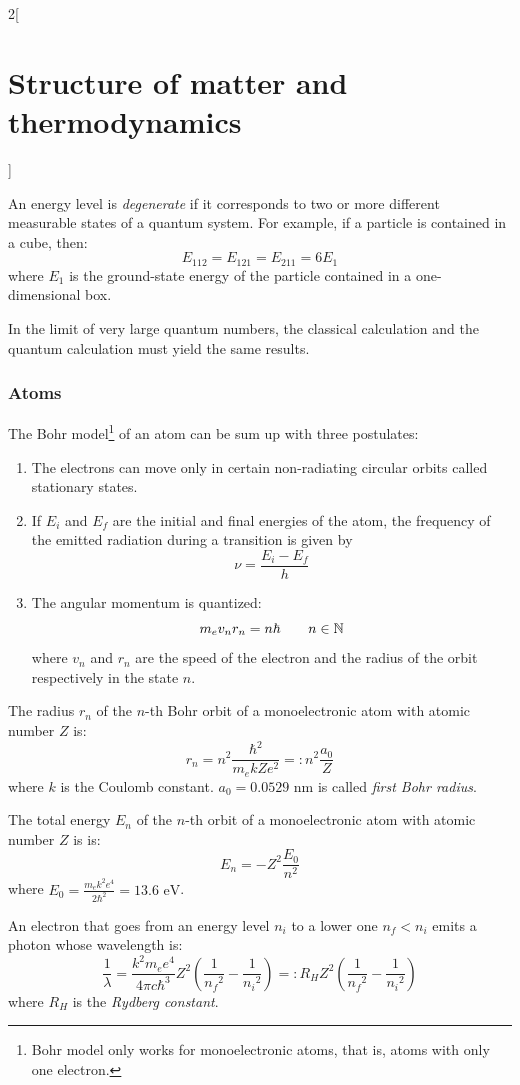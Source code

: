 \documentclass[../../../main.tex]{subfiles}
\begin{document}
\begin{multicols}{2}[\section{Structure of matter and thermodynamics}]
\begin{definition}
        An energy level is \textit{degenerate} if it corresponds to two or more different measurable states of a quantum system. For example, if a particle is contained in a cube, then: $$E_{112}=E_{121}=E_{211}=6E_1$$ where $E_1$ is the ground-state energy of the particle contained in a one-dimensional box.
    \end{definition}
    \begin{prop}
        In the limit of very large quantum numbers, the classical calculation and the quantum calculation must yield the same results.
    \end{prop}
    \subsubsection{Atoms}
    \begin{definition}
        The Bohr model\footnote{Bohr model only works for monoelectronic atoms, that is, atoms with only one electron.} of an atom can be sum up with three postulates:
        \begin{enumerate}
            \item The electrons can move only in certain non-radiating circular orbits called stationary states.
            \item If $E_i$ and $E_f$ are the initial and final energies of the atom, the frequency of the emitted radiation during a transition is given by $$\nu=\frac{E_i-E_f}{h}$$
            \item The angular momentum is quantized: $$m_ev_nr_n=n\hbar\qquad n\in\mathbb{N}$$ where $v_n$ and $r_n$ are the speed of the electron and the radius of the orbit respectively in the state $n$.
        \end{enumerate}
    \end{definition}
    \begin{prop}
        The radius $r_n$ of the $n$-th Bohr orbit of a monoelectronic atom with atomic number $Z$ is: $$r_n=n^2\frac{\hbar^2}{m_ekZe^2}=:n^2\frac{a_0}{Z}$$
        where $k$ is the Coulomb constant. $a_0=0.0529\text{ nm}$ is called \textit{first Bohr radius}.
    \end{prop}
    \begin{prop}
        The total energy $E_n$ of the $n$-th orbit of a monoelectronic atom with atomic number $Z$ is is:
        \begin{equation}\label{SMT_energy-levels}
            E_n=-Z^2\frac{E_0}{n^2}
        \end{equation}
        where $E_0=\frac{m_ek^2e^4}{2\hbar^2}=13.6\text{ eV}$.
    \end{prop}
    \begin{prop}
        An electron that goes from an energy level $n_i$ to a lower one $n_f<n_i$ emits a photon whose wavelength is:
        $$\frac{1}{\lambda}=\frac{k^2m_ee^4}{4\pi c\hbar^3}Z^2\left(\frac{1}{{n_f}^2}-\frac{1}{{n_i}^2}\right)=:R_HZ^2\left(\frac{1}{{n_f}^2}-\frac{1}{{n_i}^2}\right)$$
        where $R_H$ is the \textit{Rydberg constant}.
    \end{prop}

\end{multicols}
\end{document}
